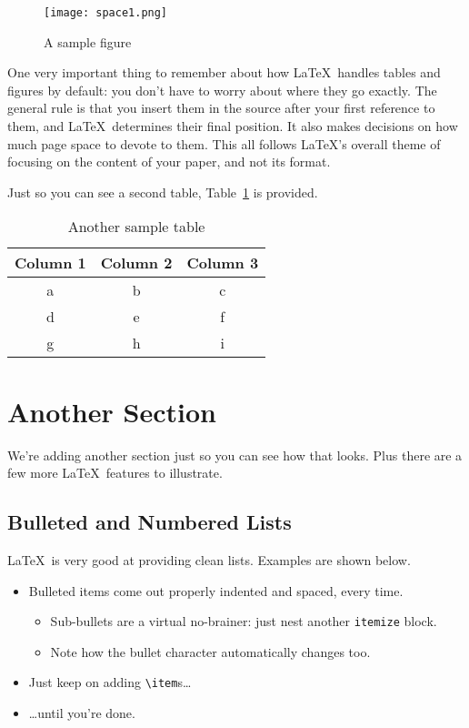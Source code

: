 \documentclass{article}
\begin{document}
\begin{figure}
\centering
\texttt{[image: space1.png]} 

\caption{A sample figure}
\label{figure-sample}
\end{figure}

One very important thing to remember about how \LaTeX\ handles tables and figures by default: you don't have to worry about where they go exactly.  The general rule is that you insert them in the source after your first reference to them, and \LaTeX\ determines their final position.  It also makes decisions on how much page space to devote to them.  This all follows \LaTeX's overall theme of focusing on the content of your paper, and not its format.

Just so you can see a second table, Table~\ref{table-sample2} is provided.

\begin{table}
\centering
\begin{tabular}{|c|c|c|}\hline
Column 1 & Column 2 & Column 3 \\\hline\hline
a & b & c \\
d & e & f \\
g & h & i \\\hline
\end{tabular}

\caption{Another sample table}
\label{table-sample2}
\end{table}

\section{Another Section}

We're adding another section just so you can see how that looks.  Plus there are a few more \LaTeX\ features to illustrate.

\subsection{Bulleted and Numbered Lists}

\LaTeX\ is very good at providing clean lists.  Examples are shown below.

\begin{itemize}
\item Bulleted items come out properly indented and spaced, every time.

\begin{itemize}
\item Sub-bullets are a virtual no-brainer: just nest another \verb!itemize! block.
\item Note how the bullet character automatically changes too.
\end{itemize}

\item Just keep on adding \verb!\item!s\ldots

\item \ldots until you're done.
\end{itemize}
\end{document}
